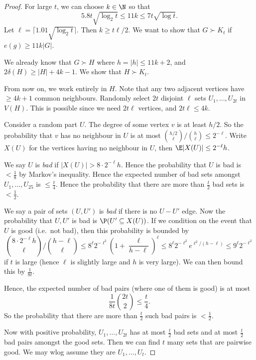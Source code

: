 \documentclass[a4paper]{article}
\begin{document}
\begin{proof}
  For large $t$, we can choose $k \in \N$ so that
  \[
    5.8t \sqrt{\log_2 t} \leq 11k \leq 7t \sqrt{\log t}.
  \]
  Let $\ell = \lceil 1.01 \sqrt{\log_2 t}\rceil$. Then $k \geq t\ell/2$. We want to show that $G \succ K_t$ if $e(g) \geq 11k |G|$.

  We already know that $G \succ H$ where $h = |h| \leq 11k + 2$, and $2 \delta(H) \geq |H| + 4k - 1$. We show that $H \succ K_t$.

  From now on, we work entirely in $H$. Note that any two adjacent vertices have $\geq 4k + 1$  common neighbours. Randomly select $2t$ disjoint $\ell$ sets $U_1, \ldots, U_{2t}$ in $V(H)$. This is possible since we need $2t \ell$ vertices, and $2t\ell \leq 4k$.

  Consider a random part $U$. The degree of some vertex $v$ is at least $h/2$. So the probability that $v$ has no neighbour in $U$ is at most $\binom{h/2}{\ell} / \binom{h}{\ell} \leq 2^{-\ell}$. Write $X(U)$ for the vertices having no neighbour in $U$, then $\E |X(U)| \leq 2^{-\ell} h$.

  We say $U$ is \emph{bad} if $|X(U)| > 8 \cdot 2^{-\ell}h$. Hence the probability that $U$ is bad is $< \frac{1}{8}$ by Markov's inequality. Hence the expected number of bad sets amongst $U_1, \ldots, U_{25}$ is $\leq \frac{t}{4}$. Hence the probability that there are more than $\frac{t}{2}$ bad sets is $< \frac{1}{2}$.

  We say a pair of sets $(U, U')$ is \emph{bad} if there is no $U-U'$ edge. Now the probability that $U, U'$ is bad is $\P(U' \subseteq X(U))$. If we condition on the event that $U$ is good (i.e.\ not bad), then this probability is bounded by
  \[
    \binom{8 \cdot 2^{-\ell} h}{\ell} / \binom{h - \ell}{\ell} \leq 8^\ell 2^{-\ell^2} \left(1 + \frac{\ell}{h - \ell}\right)^\ell \leq 8^\ell 2^{-\ell^2} e^{\ell^2/(h - \ell)} \leq 9^\ell 2^{-\ell^2}
  \]
  if $t$ is large (hence $\ell$ is slightly large and $h$ is very large). We can then bound this by $\frac{1}{8t}$.

  Hence, the expected number of bad pairs (where one of them is good) is at most
  \[
    \frac{1}{8t} \binom{2t}{2} \leq \frac{t}{4}.
  \]
  So the probability that there are more than $\frac{t}{2}$ such bad pairs is $< \frac{1}{2}$.

  Now with positive probability, $U_1, \ldots, U_{2t}$ has at most $\frac{t}{2}$ bad sets and at most $\frac{t}{2}$ bad pairs amongst the good sets. Then we can find $t$ many sets that are pairwise good. We may wlog assume they are $U_1, \ldots, U_t$.


\end{proof}
\end{document}
